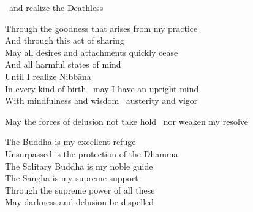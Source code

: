 \begin{english}
\begin{english-hang-inline}
  \breathmark\ and realize the Deathless\\
  \ifninebythirteenversion\end{english-hang-inline}\fi
  Through the goodness that arises from my practice\\
  And through this act of sharing\\
  May all desires and attachments quickly cease\\
  And all harmful states of mind\\
  Until I realize Nibbāna\\
  In every kind of birth \breathmark\ may I have an upright mind\\
  With mindfulness and wisdom \breathmark\ austerity and vigor\\
  \ifninebythirteenversion\begin{english-hang-inline}\fi
  May the forces of delusion\makeatletter\hyperlink{endnote135-appendix}\makeatother \thinspace
  not take hold \breathmark\ nor weaken my resolve\\
  \ifninebythirteenversion\end{english-hang-inline}\fi
  The Buddha is my excellent refuge\\
  Unsurpassed is the protection of the Dhamma\\
  The Solitary Buddha is my noble guide\makeatletter\hyperlink{endnote136-appendix}\makeatother\\
  The Saṅgha is my supreme support\\
  Through the supreme power of all these\\
  May darkness and delusion be dispelled\makeatletter\hyperlink{endnote137-appendix}\makeatother
\end{english}

\ifbfiveversion\vspace{-2pt}\fi

